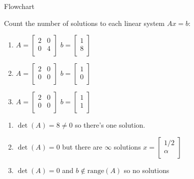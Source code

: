 \documentclass[10pt]{beamer}
\begin{document}
\begin{frame}{Flowchart}
\begin{example}
Count the number of solutions to each linear system $Ax=b$:
    \begin{enumerate}
  \item 
$A=\begin{bmatrix}2&0\\0&4\\\end{bmatrix}$
$b=\begin{bmatrix}1\\8\\\end{bmatrix}$

  \item 
$A=\begin{bmatrix}2&0\\0&0\\\end{bmatrix}$
$b=\begin{bmatrix}1\\0\\\end{bmatrix}$
  \item 
$A=\begin{bmatrix}2&0\\0&0\\\end{bmatrix}$
$b=\begin{bmatrix}1\\1\\\end{bmatrix}$
\end{enumerate}
\end{example}

\begin{enumerate}
    \item $\det(A)=8\ne0$ so there's one solution.
    \item $\det(A)=0$ but there are $\infty$ solutions $x=\begin{bmatrix}1/2\\\alpha\\\end{bmatrix}$
    \item $\det(A)=0$ and $b\notin \text{range}(A)$ so no solutions 
\end{enumerate}
\end{frame}

\end{document}

